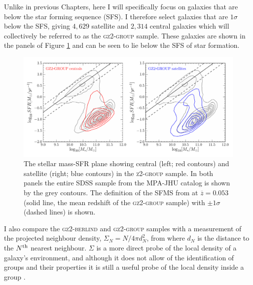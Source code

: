 Unlike in previous Chapters, here I will specifically focus on galaxies that are below the star forming sequence (SFS). I therefore select galaxies that are $1\sigma$ below the SFS, giving $4,629$ satellite and $2,314$ central galaxies which will collectively be referred to as the \textsc{gz2-group} sample. These galaxies are shown in the panels of Figure \ref{fig:sfrmass} and can be seen to lie below the SFS of star formation. 

\begin{figure}
\centering
\includegraphics[width=\textwidth]{environment/sfr_mass_quenched_centrals_satellites_gz2_group.pdf}
\caption[Stellar mass-SFR plane for the centrals and satellites of the \textsc{z2-group} sample]{The stellar mass-SFR plane showing central (left; red contours) and satellite (right; blue contours) in the \textsc{z2-group} sample. In both panels the entire SDSS sample from the MPA-JHU catalog is shown by the grey contours. The definition of the SFMS from \cite{peng10} at $\overline{z} = 0.053$ (solid line, the mean redshift of the \textsc{gz2-group} sample) with $\pm1\sigma$ (dashed lines) is shown.}
\label{fig:sfrmass}
\end{figure}


I also compare the \textsc{gz2-berlind} and \textsc{gz2-group} samples with a measurement of the projected neighbour density, $\Sigma_N = N/4\pi d_N^2$, from \cite{Baldry06} where $d_N$ is the distance to the $N^{\rm{th}}$ nearest neighbour. $\Sigma$ is a more direct probe of the local density of a galaxy's environment, and although it does not allow of the identification of groups and their properties it is still a useful probe of the local density inside a group  \cite[see][for a comparison of various environment parameterisations]{muldrew12}.

